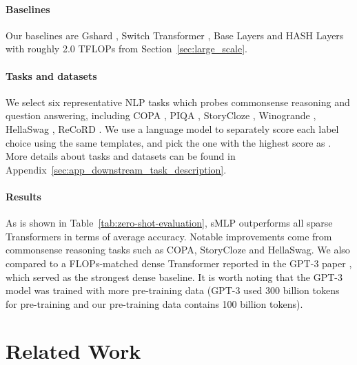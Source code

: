 \documentclass{article}
\begin{document}
\vspace{-2mm}
\paragraph{Baselines}
Our baselines are Gshard \citep{gshard}, Switch Transformer \citep{switch}, Base Layers \citep{baselayer} and HASH Layers \citep{hashlayer} with roughly 2.0 TFLOPs from Section~\ref{sec:large_scale}.

\vspace{-2mm}
\paragraph{Tasks and datasets}
We select six representative NLP tasks which probes commonsense reasoning and question answering, including COPA \citep{roemmele2011choice}, PIQA \citep{bisk2020piqa}, StoryCloze \citep{mostafazadeh2016corpus}, Winogrande \citep{levesque2012winograd}, HellaSwag \citep{zellers2019hellaswag}, ReCoRD \citep{zhang2018record}. 
We use a language model to separately score each label choice using the same templates, and pick the one with the
highest score as \citet{artetxe2021efficient}.
More details about tasks and datasets can be found in Appendix~\ref{sec:app_downstream_task_description}. 



\vspace{-2mm}
\paragraph{Results}
As is shown in Table~\ref{tab:zero-shot-evaluation}, sMLP outperforms all sparse Transformers in terms of average accuracy. Notable improvements come from commonsense reasoning tasks such as COPA, StoryCloze and HellaSwag. We also compared to a FLOPs-matched dense Transformer reported in the GPT-3 paper \citep{gpt3}, which served as the strongest dense baseline. It is worth noting that the GPT-3 model was trained with more pre-training data (GPT-3 used 300 billion tokens for pre-training and our pre-training data contains 100 billion tokens).












 \section{Related Work}
\label{sec:related_works}
\end{document}
